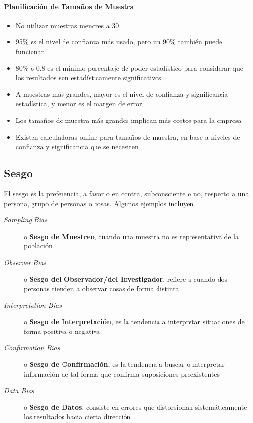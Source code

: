 \paragraph{Planificación de Tamaños de Muestra}
\begin{itemize}
    \item {No utilizar muestras menores a 30}
    \item {95\% es el nivel de confianza más usado, pero un 90\% también puede funcionar}
    \item {80\% o 0.8 es el mínimo porcentaje de poder estadístico para considerar que los resultados son estadísticamente significativos}
    \item {A muestras más grandes, mayor es el nivel de confianza y significancia estadística, y menor es el margen de error}
    \item {Los tamaños de muestra más grandes implican más costos para la empresa}
    \item {Existen calculadoras online para tamaños de muestra, en base a niveles de confianza y significancia que se necesiten}
\end{itemize}

\subsection{Sesgo}
El sesgo es la preferencia, a favor o en contra, subconsciente o no, respecto a una persona, grupo de personas o cosas. Algunos ejemplos incluyen 
    \begin{description}
        \item [\textit{Sampling Bias}]{ o \textbf{Sesgo de Muestreo}, cuando una muestra no es representativa de la población}
        \item [\textit{Observer Bias}]{ o \textbf{Sesgo del Observador/del Investigador}, refiere a cuando dos personas tienden a observar cosas de forma distinta}
        \item [\textit{Interpretation Bias}]{o \textbf{Sesgo de Interpretación}, es la tendencia a interpretar situaciones de forma positiva o negativa}
        \item [\textit{Confirmation Bias}]{ o \textbf{Sesgo de Confirmación}, es la tendencia a buscar o interpretar información de tal forma que confirma suposiciones preexistentes}
        \item [\textit{Data Bias}]{ o \textbf{Sesgo de Datos}, consiste en errores que distorsionan sistemáticamente los resultados hacia cierta dirección}
    \end{description}

